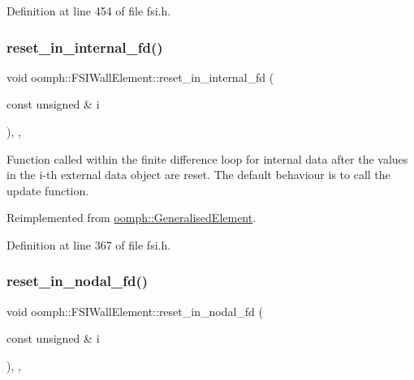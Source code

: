 Definition at line 454 of file fsi.\+h.

\mbox{\label{classoomph_1_1FSIWallElement_aed714993ced295b7ddb5f014ffc2ba6a}} 
\subsubsection{\texorpdfstring{reset\+\_\+in\+\_\+internal\+\_\+fd()}{reset\_in\_internal\_fd()}}
{\footnotesize\ttfamily void oomph\+::\+F\+S\+I\+Wall\+Element\+::reset\+\_\+in\+\_\+internal\+\_\+fd (\begin{DoxyParamCaption}\item[{const unsigned \&}]{i }\end{DoxyParamCaption})\hspace{0.3cm}{\ttfamily [inline]}, {\ttfamily [protected]}, {\ttfamily [virtual]}}



Function called within the finite difference loop for internal data after the values in the i-\/th external data object are reset. The default behaviour is to call the update function. 



Reimplemented from \hyperlink{classoomph_1_1GeneralisedElement_a89c6c5cf8b4d8b451caa124b346e5e8d}{oomph\+::\+Generalised\+Element}.



Definition at line 367 of file fsi.\+h.

\mbox{\label{classoomph_1_1FSIWallElement_afb13bbbad0afbf83b45bac82ac7f50b5}} 
\subsubsection{\texorpdfstring{reset\+\_\+in\+\_\+nodal\+\_\+fd()}{reset\_in\_nodal\_fd()}}
{\footnotesize\ttfamily void oomph\+::\+F\+S\+I\+Wall\+Element\+::reset\+\_\+in\+\_\+nodal\+\_\+fd (\begin{DoxyParamCaption}\item[{const unsigned \&}]{i }\end{DoxyParamCaption})\hspace{0.3cm}{\ttfamily [inline]}, {\ttfamily [protected]}, {\ttfamily [virtual]}}



